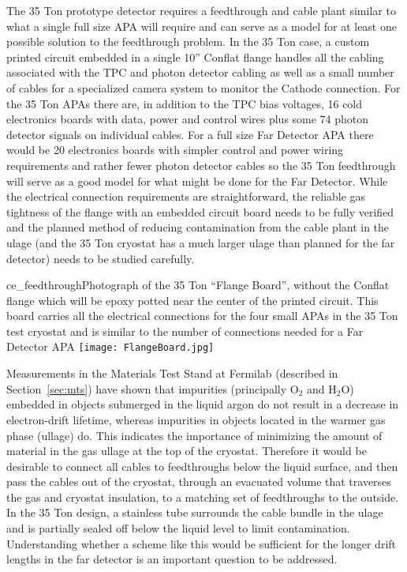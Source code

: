 The 35 Ton prototype detector requires a feedthrough and cable plant similar to what a single full size APA
will require and can serve as a model for at least one possible solution to the feedthrough problem.
In the 35 Ton case, a custom printed circuit embedded in a single 10'' Conflat flange handles all the cabling
associated with the TPC and photon detector cabling as well as a small number of cables for a specialized
camera system to monitor the Cathode connection.
For the 35 Ton APAs there are, in addition to the TPC bias voltages, 16 cold electronics boards with data,
power and control wires plus some 74 photon detector signals on individual cables.
For a full size Far Detector APA there would be 20 electronics boards with simpler control and power wiring
requirements and rather fewer photon detector cables so the 35 Ton feedthrough will serve as a good model
for what might be done for the Far Detector.
While the electrical connection requirements are straightforward,
the reliable gas tightness of the flange with an embedded circuit board needs to be fully verified
and the planned method of reducing contamination from the cable plant in the ulage
(and the 35 Ton cryostat has a much larger ulage than planned for the far detector) needs to be studied carefully.


\begin{cdrfigure}{ce_feedthrough}{Photograph of the 35 Ton ``Flange Board'', without the Conflat flange which will be epoxy potted near
  the center of the printed circuit.
  This board carries all the electrical connections for the four small APAs in the 35 Ton
  test cryostat and is similar to the number of connections needed for a Far Detector APA}
\texttt{[image: FlangeBoard.jpg]}
\end{cdrfigure}


Measurements in the Materials Test Stand at Fermilab (described in Section~\ref{sec:mts})
have shown that impurities (principally O$_2$ and H$_2$O) embedded in objects submerged in the liquid argon do not result
in a decrease in electron-drift lifetime, whereas impurities in objects located in the warmer gas phase (ullage) do.
This indicates the importance of minimizing the amount of material in the gas ullage at the top of the cryostat.
Therefore it would be desirable to connect all cables to feedthroughs below the liquid surface,
and then pass the cables out of the cryostat, through an evacuated volume that traverses the gas and cryostat insulation,
to a matching set of feedthroughs to the outside.
In the 35 Ton design, a stainless tube surrounds the cable bundle in the ulage and is partially sealed off below the
liquid level to limit contamination.
Understanding whether a scheme like this would be sufficient for the longer drift lengths in the far detector
is an important question to be addressed.

